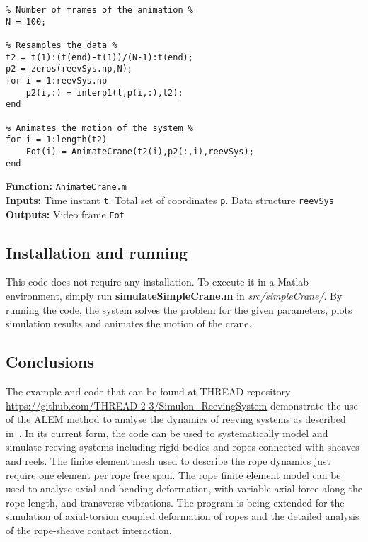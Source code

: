 {\begin{tcolorbox}\begin{lstlisting}[style=Matlab-editor]
% Animation of crane motion %
% Number of frames of the animation %
N = 100;

% Resamples the data %
t2 = t(1):(t(end)-t(1))/(N-1):t(end);
p2 = zeros(reevSys.np,N);
for i = 1:reevSys.np
    p2(i,:) = interp1(t,p(i,:),t2);
end

% Animates the motion of the system %
for i = 1:length(t2)
    Fot(i) = AnimateCrane(t2(i),p2(:,i),reevSys);
end
\end{lstlisting}\end{tcolorbox}}


\setlength{\parindent}{0cm}
\textbf{Function:} \texttt{AnimateCrane.m} \\
\textbf{Inputs:} Time instant \texttt{t}. Total set of coordinates \texttt{p}. Data structure \texttt{reevSys} \\
\textbf{Outputs:} Video frame \texttt{Fot} \\


\subsection{Installation and running}
 This code does not require any installation. To execute it in a Matlab environment, simply run \textbf{simulateSimpleCrane.m} in \textit{src/simpleCrane/}. By running the code, the system solves the problem for the given parameters, plots simulation results and animates the motion of the crane. 

\subsection{Conclusions}
The example and code that can be found at THREAD repository \url{https://github.com/THREAD-2-3/Simulon_ReevingSystem} demonstrate the use of the ALEM method  to analyse the dynamics of reeving systems as described in~\cite{EscalonaOrzechowskiMikkola2018}. In its current form, the code can be used to systematically model and simulate reeving systems including rigid bodies and ropes connected with sheaves and reels. The finite element mesh used to describe the rope dynamics just require one element per rope free span. The rope finite element model can be used to analyse axial and bending deformation, with variable axial force along the rope length, and transverse vibrations. 
The program is being extended for the simulation of axial-torsion coupled deformation of ropes and the detailed analysis of the rope-sheave contact interaction.



